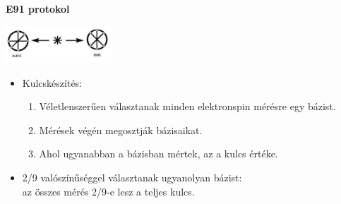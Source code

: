 \documentclass{beamer}
\begin{document}
    \begin{frame}

        \center

        \textbf{E91 protokol}

        \includegraphics[width=0.3\textwidth]{e91source.jpg}

        \begin{itemize}
            \item Kulcskészítés:
                \begin{enumerate}
                    \item Véletlenszerűen választanak minden elektronspin mérésre egy bázist.
                    \item Mérések végén megosztják bázisaikat.
                    \item Ahol ugyanabban a bázisban mértek, az a kulcs értéke.
                \end{enumerate}
            \item 2/9 valószínűséggel választanak ugyanolyan bázist:
                \\az összes mérés 2/9-e lesz a teljes kulcs.
        \end{itemize}

    \end{frame}
\end{document}
